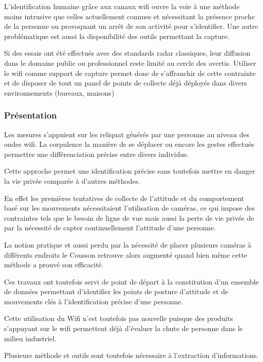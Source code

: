 \documentclass[conference,compsoc]{IEEEtran}
\begin{document}
L'identification humaine grâce aux canaux wifi ouvre la voie à une méthode moins intrusive que celles actuellement connues et nécessitant la présence proche de la personne ou provoquant un arrêt de son activité pour s'identifier. Une autre problématique est aussi la disponibilité des outils permettant la capture. 

Si des essais ont été effectués avec des standards radar classiques, leur diffusion dans le domaine public ou professionnel reste limité au cercle des avertis. Utiliser le wifi comme support de capture permet donc de s'affranchir de cette contrainte et de disposer de tout un panel de points de collecte déjà déployés dans divers environnements (bureaux, maisons)
 
\subsubsection{Présentation}

Les mesures s'appuient sur les reliquat générés par une personne au niveau des ondes wifi. La corpulence la manière de se déplacer ou encore les gestes effectués permettre une différenciation précise entre divers individus.

Cette approche permet une identification précise sans toutefois mettre en danger la vie privée comparée à d'autres méthodes.

En effet les premières tentatives de collecte de l'attitude et du comportement basé sur les mouvements nécessitaient l'utilisation de caméras, ce qui impose des contraintes tels que le besoin de ligne de vue mais aussi la perte de vie privée de par la nécessité de capter continuellement l'attitude d'une personne.

La notion pratique et aussi perdu par la nécessité de placer plusieurs caméras à différents endroits le Cousson retrouve alors augmenté quand bien même cette méthode a prouvé son efficacité.

Ces travaux ont toutefois servi de point de départ à la constitution d'un ensemble de données permettant d'identifier les points de posture d'attitude et de mouvements clés à l'identification précise d'une personne.

Cette utilisation du Wifi n'est toutefois pas nouvelle puisque des produits s'appuyant sur le wifi permettent déjà d'évaluer la chute de personne dans le milieu industriel.

Plusieurs méthode et outils sont toutefois nécessaire à l'extraction d'informations.
\end{document}
